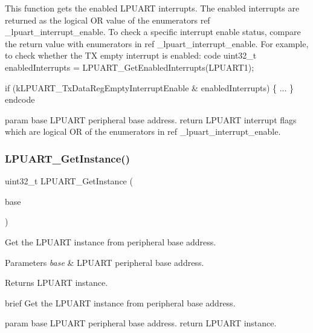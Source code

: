 This function gets the enabled L\+P\+U\+A\+RT interrupts. The enabled interrupts are returned as the logical OR value of the enumerators ref \+\_\+lpuart\+\_\+interrupt\+\_\+enable. To check a specific interrupt enable status, compare the return value with enumerators in ref \+\_\+lpuart\+\_\+interrupt\+\_\+enable. For example, to check whether the TX empty interrupt is enabled\+: code uint32\+\_\+t enabled\+Interrupts = L\+P\+U\+A\+R\+T\+\_\+\+Get\+Enabled\+Interrupts(\+L\+P\+U\+A\+R\+T1);

if (k\+L\+P\+U\+A\+R\+T\+\_\+\+Tx\+Data\+Reg\+Empty\+Interrupt\+Enable \& enabled\+Interrupts) \{ ... \} endcode

param base L\+P\+U\+A\+RT peripheral base address. return L\+P\+U\+A\+RT interrupt flags which are logical OR of the enumerators in ref \+\_\+lpuart\+\_\+interrupt\+\_\+enable. \mbox{\label{group__lpuart__driver_gaaf4c8ce1f1730cdbf094931033d9b52c}} 
\subsubsection{\texorpdfstring{LPUART\_GetInstance()}{LPUART\_GetInstance()}}
{\footnotesize\ttfamily uint32\+\_\+t L\+P\+U\+A\+R\+T\+\_\+\+Get\+Instance (\begin{DoxyParamCaption}\item[{\mbox{\hyperlink{struct_l_p_u_a_r_t___type}{L\+P\+U\+A\+R\+T\+\_\+\+Type}} $\ast$}]{base }\end{DoxyParamCaption})}



Get the L\+P\+U\+A\+RT instance from peripheral base address. 


\begin{DoxyParams}{Parameters}
{\em base} & L\+P\+U\+A\+RT peripheral base address. \\
\hline
\end{DoxyParams}
\begin{DoxyReturn}{Returns}
L\+P\+U\+A\+RT instance.
\end{DoxyReturn}
brief Get the L\+P\+U\+A\+RT instance from peripheral base address.

param base L\+P\+U\+A\+RT peripheral base address. return L\+P\+U\+A\+RT instance. \mbox{\label{group__lpuart__driver_gab83db963591b116f90daf3e24118cb09}} 
